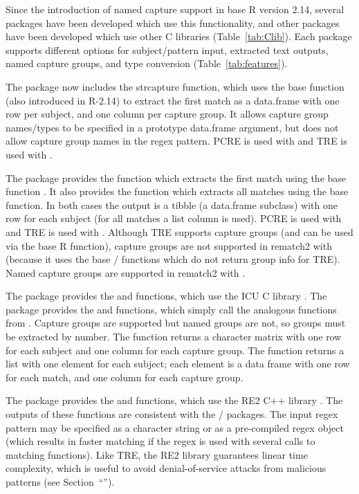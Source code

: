 Since the introduction of named capture support in base R version
2.14, several packages have been developed which use this
functionality, and other packages have been developed which use other
C libraries (Table~\ref{tab:Clib}). Each package supports different
options for subject/pattern input, extracted text outputs, named
capture groups, and type conversion (Table~\ref{tab:features}).

The  package now includes the strcapture function, which uses the
base  function (also introduced in R-2.14) to extract the first
match as a data.frame with one row per subject, and one column per
capture group. It allows capture group names/types to be specified in
a prototype data.frame argument, but does not allow capture group
names in the regex pattern. PCRE is used with 
and TRE is used with .
 
The  package provides the  function which
extracts the first match using the base  function
\citep{rematch2}. It also provides the  function
which extracts all matches using the base  function. In
both cases the output is a tibble (a data.frame subclass) with one row
for each subject (for all matches a list column is used). PCRE is used
with  and TRE is used with . Although
TRE supports capture groups (and can be used via the base R 
function), capture groups are not supported in rematch2 with
 (because it uses the base / functions
which do not return group info for TRE). Named capture groups are
supported in rematch2 with .

The  package provides the  and
 functions, which use the ICU C library
\citep{stringi}. The  package provides the  and
 functions, which simply call the analogous
functions from . Capture groups are supported but named groups
are not, so groups must be extracted by number. The 
function returns a character matrix with one row for each subject and
one column for each capture group. The  function
returns a list with one element for each subject; each element is a
data frame with one row for each match, and one column for each
capture group.

The  package provides the  and
 functions, which use the RE2 C++ library
\citep{re2r}. The outputs of these functions are consistent with the
/ packages. The input regex pattern may be specified as
a character string or as a pre-compiled regex object (which
results in faster matching if the regex is used with several calls to
matching functions). Like TRE, the RE2 library guarantees linear
time complexity, which is useful to avoid denial-of-service attacks
from malicious patterns (see Section~``\sectiontimings'').

